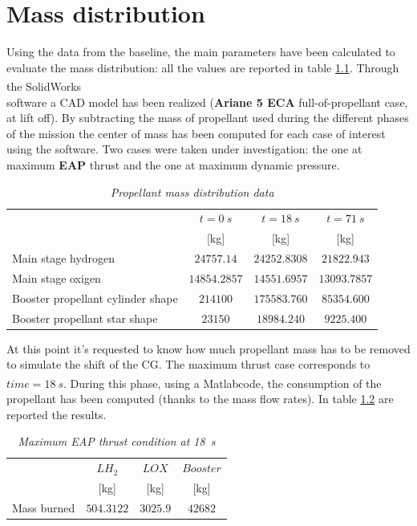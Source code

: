 \documentclass[12pt,fleqn,openany]{book} %
\begin{document}
\chapter{Mass distribution}\label{chap:mass}
Using the data from the baseline, the main parameters have been calculated to evaluate the mass distribution: all the values are reported in table \hypertarget{tab:mdata}{\ref{tab:mdata}}. Through the SolidWorks\textsuperscript\textregistered \\software a CAD model has been realized (\textbf{Ariane 5 ECA} full-of-propellant case, at lift off). By subtracting the mass of propellant used during the different phases of the mission the center of mass has been computed for each case of interest using the software. Two cases were taken under investigation: the one at maximum \textbf{EAP} thrust and the one at maximum dynamic pressure. 

\begin{table}[h]
	\centering
	\begin{tabular}{ l c c c}
\toprule
										&$t=\SI{0}{s}$ 			&$t = \SI{18}{s}$ 		&$t = \SI{71}{s}$	\\
										&[\si{\kilogram}]			&[\si{\kilogram}]			&[\si{\kilogram}]		\\
\midrule                                                                                                             
Main stage hydrogen 					&$24757.14$			&$24252.8308$			&$21822.943 $		\\
Main stage oxigen 						&$14854.2857$			&$14551.6957$			&$13093.7857$        \\
Booster propellant cylinder shape 		&$214100	   $		&	$175583.760$		&	$85354.600 $        \\
Booster propellant star shape 			&$23150	   $			&$18984.240 $			&$9225.400  $        \\
\bottomrule
\end{tabular} 
\caption{\emph{Propellant mass distribution data}}
\label{tab:mdata}
\end{table}
\noindent At this point it’s requested to know how much propellant mass has to be removed to simulate the shift of the CG. The maximum thrust case corresponds to $time = \SI{18}{s}$. During this phase, using a Matlab\textsuperscript\textregistered code, the consumption of the propellant has been computed (thanks to the mass flow rates). In table \hypertarget{tab:maxEAP}{\ref{tab:maxEAP}} are reported the results. 
\begin{table}[h]
	\centering
	\begin{tabular}{ l c c c}
\toprule
										&$LH_2$ 			&$LOX$ 				&$Booster$	\\
										&[\si{\kilogram}]			&[\si{\kilogram}]			&[\si{\kilogram}]		\\
\midrule                                                                                                             
Mass burned								&$504.3122$			&$3025.9$			&$42682$			\\
\bottomrule
\end{tabular} 
\caption{\emph{Maximum EAP thrust condition at \SI{18}{s}}}        
\label{tab:maxEAP}                       
\end{table}                             
                      
\end{document}
